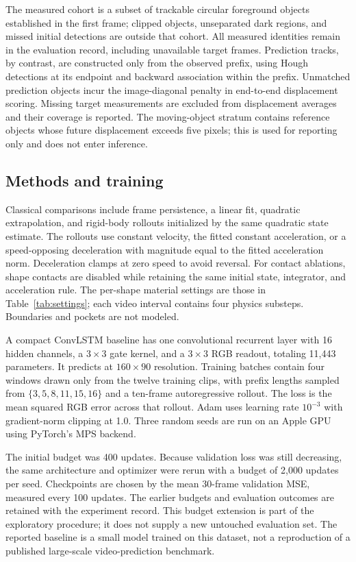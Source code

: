 The measured cohort is a subset of trackable circular foreground objects established in the first frame; clipped objects, unseparated dark regions, and missed initial detections are outside that cohort. All measured identities remain in the evaluation record, including unavailable target frames. Prediction tracks, by contrast, are constructed only from the observed prefix, using Hough detections at its endpoint and backward association within the prefix. Unmatched prediction objects incur the image-diagonal penalty in end-to-end displacement scoring. Missing target measurements are excluded from displacement averages and their coverage is reported. The moving-object stratum contains reference objects whose future displacement exceeds five pixels; this is used for reporting only and does not enter inference.

\subsection{Methods and training}

Classical comparisons include frame persistence, a linear fit, quadratic extrapolation, and rigid-body rollouts initialized by the same quadratic state estimate. The rollouts use constant velocity, the fitted constant acceleration, or a speed-opposing deceleration with magnitude equal to the fitted acceleration norm. Deceleration clamps at zero speed to avoid reversal. For contact ablations, shape contacts are disabled while retaining the same initial state, integrator, and acceleration rule. The per-shape material settings are those in Table~\ref{tab:settings}; each video interval contains four physics substeps. Boundaries and pockets are not modeled.

A compact ConvLSTM baseline has one convolutional recurrent layer with 16 hidden channels, a $3\times3$ gate kernel, and a $3\times3$ RGB readout, totaling 11,443 parameters. It predicts at $160\times90$ resolution. Training batches contain four windows drawn only from the twelve training clips, with prefix lengths sampled from $\{3,5,8,11,15,16\}$ and a ten-frame autoregressive rollout. The loss is the mean squared RGB error across that rollout. Adam uses learning rate $10^{-3}$ with gradient-norm clipping at 1.0. Three random seeds are run on an Apple GPU using PyTorch's MPS backend.

The initial budget was 400 updates. Because validation loss was still decreasing, the same architecture and optimizer were rerun with a budget of 2,000 updates per seed. Checkpoints are chosen by the mean 30-frame validation MSE, measured every 100 updates. The earlier budgets and evaluation outcomes are retained with the experiment record. This budget extension is part of the exploratory procedure; it does not supply a new untouched evaluation set. The reported baseline is a small model trained on this dataset, not a reproduction of a published large-scale video-prediction benchmark.

